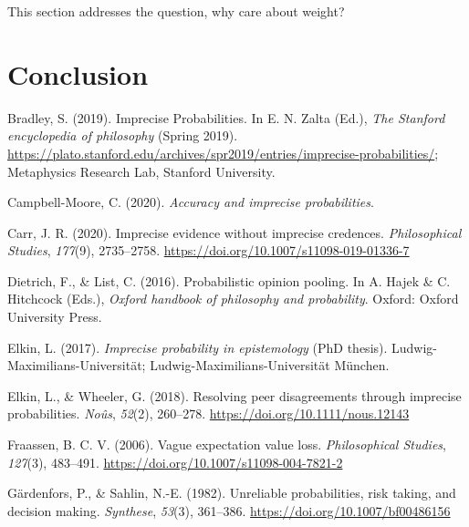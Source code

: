 \documentclass[
  10pt,
  dvipsnames,enabledeprecatedfontcommands]{scrartcl}
\newlength{\cslhangindent}
\newlength{\cslentryspacingunit} %
\newenvironment{CSLReferences}[2] %
 {%
  \setlength{\parindent}{0pt}
  \ifodd #1
  \let\oldpar\par
  \def\par{\hangindent=\cslhangindent\oldpar}
  \fi
  \setlength{\parskip}{#2\cslentryspacingunit}
 }%
 {}
\begin{document}
This section addresses the question, why care about weight?

\hypertarget{conclusion}{%
\section*{Conclusion}\label{conclusion}}

\hypertarget{refs}{}
\begin{CSLReferences}{1}{0}
\leavevmode{}%
Bradley, S. (2019). {Imprecise Probabilities}. In E. N. Zalta (Ed.),
\emph{The {Stanford} encyclopedia of philosophy} ({S}pring 2019).
\url{https://plato.stanford.edu/archives/spr2019/entries/imprecise-probabilities/};
Metaphysics Research Lab, Stanford University.

\leavevmode{}%
Campbell-Moore, C. (2020). \emph{Accuracy and imprecise probabilities}.

\leavevmode{}%
Carr, J. R. (2020). Imprecise evidence without imprecise credences.
\emph{Philosophical Studies}, \emph{177}(9), 2735--2758.
\url{https://doi.org/10.1007/s11098-019-01336-7}

\leavevmode{}%
Dietrich, F., \& List, C. (2016). Probabilistic opinion pooling. In A.
Hajek \& C. Hitchcock (Eds.), \emph{Oxford handbook of philosophy and
probability}. Oxford: Oxford University Press.

\leavevmode{}%
Elkin, L. (2017). \emph{Imprecise probability in epistemology} (PhD
thesis). Ludwig-Maximilians-Universit{ä}t;
Ludwig-Maximilians-Universität München.

\leavevmode{}%
Elkin, L., \& Wheeler, G. (2018). Resolving peer disagreements through
imprecise probabilities. \emph{Noûs}, \emph{52}(2), 260--278.
\url{https://doi.org/10.1111/nous.12143}

\leavevmode{}%
Fraassen, B. C. V. (2006). Vague expectation value loss.
\emph{Philosophical Studies}, \emph{127}(3), 483--491.
\url{https://doi.org/10.1007/s11098-004-7821-2}

\leavevmode{}%
Gärdenfors, P., \& Sahlin, N.-E. (1982). Unreliable probabilities, risk
taking, and decision making. \emph{Synthese}, \emph{53}(3), 361--386.
\url{https://doi.org/10.1007/bf00486156}


\end{CSLReferences}
\end{document}
